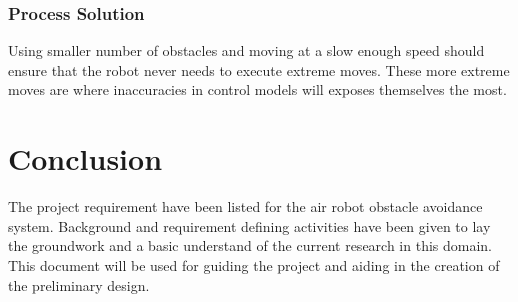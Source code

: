 \documentclass{article}
\begin{document}
		\subsubsection{Process Solution}
		
		Using smaller number of obstacles and moving at a slow enough speed should ensure that the robot never needs to execute extreme moves. These more extreme moves are where inaccuracies in control models will exposes themselves the most. 

\section{Conclusion}

The project requirement have been listed for the air robot obstacle avoidance system. Background and requirement defining activities have been given to lay the groundwork and a basic understand of the current research in this domain. This document will be used for guiding the project and aiding in the creation of the preliminary design. 


\printbibliography

\end{document}
